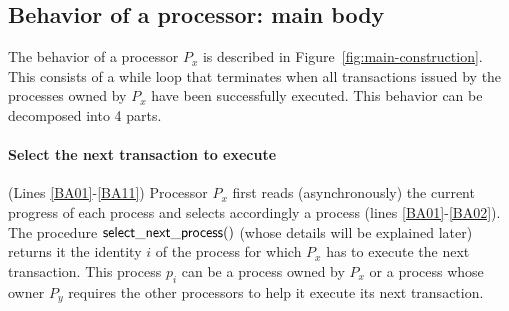 \begin{figure}[h!]
\end{figure}


\subsection{Behavior of a processor: main body}
The behavior of a processor $P_x$ is described in 
Figure~\ref{fig:main-construction}. This  consists of a while loop
that   terminates   when all transactions  issued by the processes owned by
$P_x$ have  been successfully   executed. This  behavior can  be decomposed
into 4 parts. 



\paragraph{Select the next transaction to execute} 
(Lines \ref{BA01}-\ref{BA11}) 
Processor $P_x$  first reads (asynchronously) the current  progress of each
process  and  selects accordingly   a process (lines  \ref{BA01}-\ref{BA02}). 
The procedure ${\sf select\_next\_process}()$  (whose details will be explained
later) returns it the identity $i$ of the process for which $P_x$ has to 
execute the next transaction. This process  $p_i$ can be a process owned by
$P_x$ or a process whose owner $P_y$ requires the other processors to help it
execute its next transaction.


